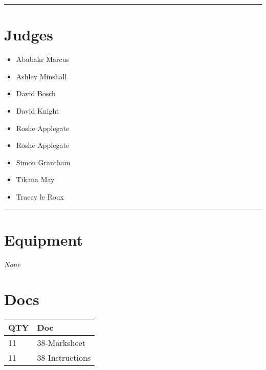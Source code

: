 \documentclass[10pt]{article}
\begin{document}
\vspace{0.5cm}
	\hrule
	\vspace{0.5cm}
		\section*{\faUsers \: Judges}

		

	\begin{multicols}{2}

		\begin{itemize}
									\item Abubakr Marcus
									\item Ashley Minshall
									\item David Bosch
									\item David Knight
									\item Roshe Applegate
						\end{itemize}

		\vfill\null
		\columnbreak

		\begin{itemize}
									\item Roshe Applegate
									\item Simon Grantham
									\item Tikana May
									\item Tracey le Roux
						\end{itemize}

		\vfill\null

		\end{multicols}



			\vspace{0.5cm}
	\hrule
	\vspace{0.5cm}

	\begin{multicols}{2}

		\section*{\faWrench \: Equipment}

				\textit{None}
		
		\vfill\null
		\columnbreak

			\section*{\faFile \: Docs}
		 	\begin{center}
			\begin{tabular}{p{2cm}p{4cm}}

			\textbf{QTY} & \textbf{Doc} \\\toprule
										11&38-Marksheet\\\midrule
										11&38-Instructions\\\midrule
							\end{tabular}
			\end{center}
	

		\vfill\null

		\end{multicols}
\end{document}
